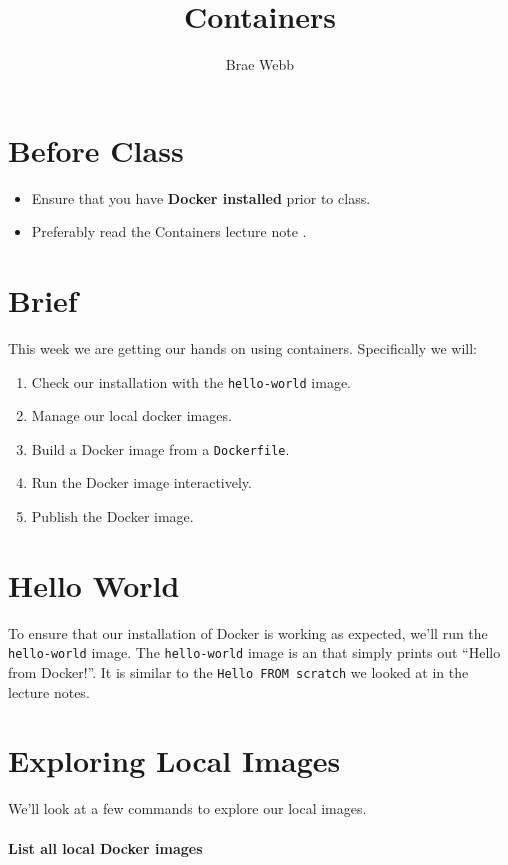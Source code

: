 \documentclass{csse4400}
\title{Containers}
\author{Brae Webb}
\date{\week{3}}
\begin{document}
\maketitle

\section{Before Class}
\begin{itemize}
    \item Ensure that you have \textbf{Docker installed} prior to class.
    \item Preferably read the Containers lecture note \cite{container-notes}.
\end{itemize}

\section{Brief}
This week we are getting our hands on using containers.
Specifically we will:
\begin{enumerate}
    \item Check our installation with the \texttt{hello-world} image.
    \item Manage our local docker images.
    \item Build a Docker image from a \texttt{Dockerfile}.
    \item Run the Docker image interactively.
    \item Publish the Docker image.
\end{enumerate}

\section{Hello World}
To ensure that our installation of Docker is working as expected,
we'll run the \texttt{hello-world} image.
The \texttt{hello-world} image is an 
that simply prints out ``Hello from Docker!''.
It is similar to the \texttt{Hello FROM scratch} we looked at in the lecture notes.


\section{Exploring Local Images}
We'll look at a few commands to explore our local images.

\paragraph{List all local Docker images}
\end{document}
